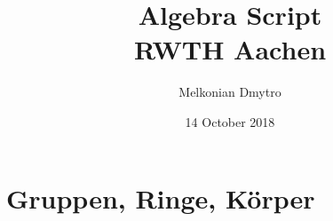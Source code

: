 \documentclass[12pt, twoside, openright]{report}
\title{
	{Algebra Script}\\
	{\large RWTH Aachen}\\
}
\author{Melkonian Dmytro}
\date{14 October 2018}
\theoremstyle{definition} %
\theoremstyle{definition} %
\theoremstyle{definition} %
\theoremstyle{definition} %
\theoremstyle{definition} %
\theoremstyle{remark} %
\begin{document}
	\maketitle

	\tableofcontents	
	
	\chapter{Gruppen, Ringe, Körper}
	
	
\end{document}
